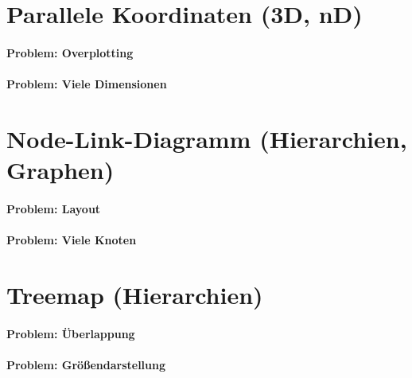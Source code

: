 \documentclass[a4paper, 11pt, accentcolor = tud3b]{tudreport}
\begin{document}
		\section{Parallele Koordinaten (3D, nD)} %

			\paragraph{Problem: Overplotting} %

			\paragraph{Problem: Viele Dimensionen} %

		\section{Node-Link-Diagramm (Hierarchien, Graphen)} %

			\paragraph{Problem: Layout} %

			\paragraph{Problem: Viele Knoten} %

		\section{Treemap (Hierarchien)} %

			\paragraph{Problem: Überlappung} %

			\paragraph{Problem: Größendarstellung} %
\end{document}
